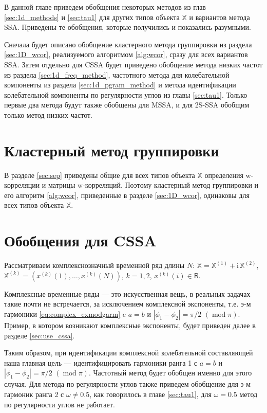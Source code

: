 \documentclass[specialist,
               substylefile = spbu.rtx,
               subf,href,colorlinks=true, 12pt]{disser}
\def\mod{\mathop{\mathrm{mod}}}
\newcommand{\I}{\mathrm{i}}
\begin{document}
В данной главе приведем обобщения некоторых методов из глав \ref{sec:1d_methods} и \ref{sec:tau1} для других типов объекта $\mathbb{X}$ и вариантов метода SSA. Приведены те обобщения, которые получились и  показались разумными.

Сначала будет описано обобщение кластерного метода группировки из раздела \ref{sec:1D_wcor}, реализуемого алгоритмом \ref{alg:wcor}, сразу для всех вариантов SSA.
Затем отдельно для CSSA будет приведено обобщение метода низких частот из раздела \ref{sec:1d_freq_method}, частотного метода для колебательной компоненты из раздела \ref{sec:1d_pgram_method} и метода идентификации колебательной компоненты по регулярности углов из главы \ref{sec:tau1}.
Только первые два метода будут также обобщены для MSSA, и для 2S-SSA обобщим только метод низких частот.

\section{Кластерный метод группировки}
В разделе \ref{sec:sep} приведены общие для всех типов объекта $\mathbb{X}$ определения w-корреляции и матрицы w-корреляций. Поэтому кластерный метод группировки и его алгоритм \ref{alg:wcor}, приведенные в разделе \ref{sec:1D_wcor}, одинаковы для всех типов объекта $\mathbb{X}$.

\section{Обобщения для CSSA}
Рассматриваем комплекснозначный временной ряд длины $N$: $\mathbb{X}=\mathbb{X}^{(1)} + \I \,\mathbb{X}^{(2)}$, $\mathbb{X}^{(k)}= \left(x^{(k)}(1),\ldots,x^{(k)}(N)\right)$, $k=1,2$, $x^{(k)}(i) \in \mathsf{R}$.

Комплексные временные ряды --- это искусственная вещь, в реальных задачах такие почти не встречается, за исключением комплексной экспоненты, т.е. э-м гармоники \eqref{eq:complex_exmodgarm} c $a=b$ и $|\phi_1 - \phi_2| = \pi/2 \,\,(\mod \pi)$. Пример, в котором возникают комплексные экспоненты, будет приведен далее в разделе \ref{sec:use_cssa}.

Таким образом, при идентификации комплексной колебательной составляющей наша главная цель --- идентифицировать гармоники ранга 1 с $a=b$ и $|\phi_1 - \phi_2| = \pi/2 \,\,(\mod \pi)$.
Частотный метод будет обобщен именно для этого случая. Для метода по регулярности углов также приведем обобщение для э-м гармоник ранга 2 с $\omega \not = 0.5$, как говорилось в главе \ref{sec:tau1}, для $\omega=0.5$ метод по регулярности углов не работает. 
\end{document}
